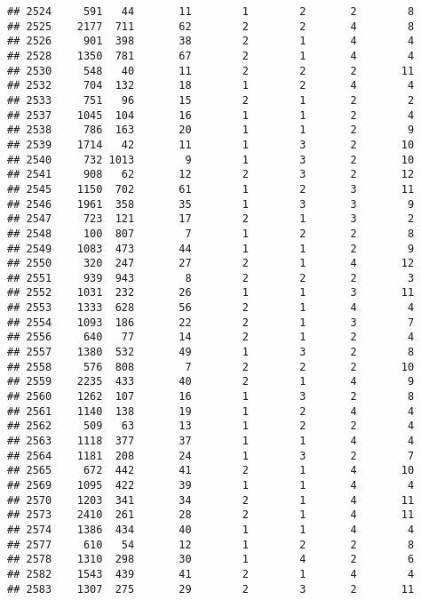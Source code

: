 \documentclass[]{article}
\begin{document}
\begin{verbatim}
## 2524     591   44       11        1        2       2        8
## 2525    2177  711       62        2        2       4        8
## 2526     901  398       38        2        1       4        4
## 2528    1350  781       67        2        1       4        4
## 2530     548   40       11        2        2       2       11
## 2532     704  132       18        1        2       4        4
## 2533     751   96       15        2        1       2        2
## 2537    1045  104       16        1        1       2        4
## 2538     786  163       20        1        1       2        9
## 2539    1714   42       11        1        3       2       10
## 2540     732 1013        9        1        3       2       10
## 2541     908   62       12        2        3       2       12
## 2545    1150  702       61        1        2       3       11
## 2546    1961  358       35        1        3       3        9
## 2547     723  121       17        2        1       3        2
## 2548     100  807        7        1        2       2        8
## 2549    1083  473       44        1        1       2        9
## 2550     320  247       27        2        1       4       12
## 2551     939  943        8        2        2       2        3
## 2552    1031  232       26        1        1       3       11
## 2553    1333  628       56        2        1       4        4
## 2554    1093  186       22        2        1       3        7
## 2556     640   77       14        2        1       2        4
## 2557    1380  532       49        1        3       2        8
## 2558     576  808        7        2        2       2       10
## 2559    2235  433       40        2        1       4        9
## 2560    1262  107       16        1        3       2        8
## 2561    1140  138       19        1        2       4        4
## 2562     509   63       13        1        2       2        4
## 2563    1118  377       37        1        1       4        4
## 2564    1181  208       24        1        3       2        7
## 2565     672  442       41        2        1       4       10
## 2569    1095  422       39        1        1       4        4
## 2570    1203  341       34        2        1       4       11
## 2573    2410  261       28        2        1       4       11
## 2574    1386  434       40        1        1       4        4
## 2577     610   54       12        1        2       2        8
## 2578    1310  298       30        1        4       2        6
## 2582    1543  439       41        2        1       4        4
## 2583    1307  275       29        2        3       2       11

\end{verbatim}
\end{document}
